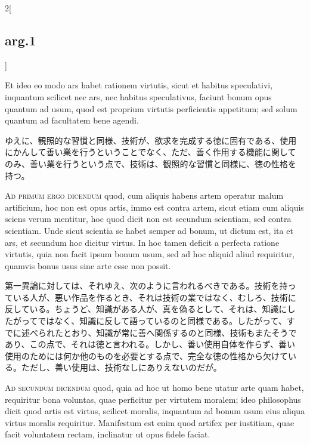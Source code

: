 \documentclass[paper=a4paper,fontsize=10pt,jafontsize=9pt,titlepage]{jlreq}
\begin{document}
\begin{paracol}{2}[\subsection{arg.1}]
\switchcolumn*

Et ideo eo modo ars habet rationem virtutis, sicut et habitus
speculativi, inquantum scilicet nec ars, nec habitus speculativus,
faciunt bonum opus quantum ad usum, quod est proprium virtutis
perficientis appetitum; sed solum quantum ad facultatem bene agendi.

\switchcolumn

ゆえに、観照的な習慣と同様、技術が、欲求を完成する徳に固有である、使用
にかんして善い業を行うということでなく、ただ、善く作用する機能に関して
のみ、善い業を行うという点で、技術は、観照的な習慣と同様に、徳の性格を
持つ。

\switchcolumn*[\subsection{ad.1}]

{\scshape Ad primum ergo dicendum} quod, cum aliquis habens artem
operatur malum artificium, hoc non est opus artis, immo est contra
artem, sicut etiam cum aliquis sciens verum mentitur, hoc quod dicit
non est secundum scientiam, sed contra scientiam. Unde sicut scientia
se habet semper ad bonum, ut dictum est, ita et ars, et secundum hoc
dicitur virtus. In hoc tamen deficit a perfecta ratione virtutis, quia
non facit ipsum bonum usum, sed ad hoc aliquid aliud requiritur,
quamvis bonus usus sine arte esse non possit.

\switchcolumn

第一異論に対しては、それゆえ、次のように言われるべきである。技術を持っ
ている人が、悪い作品を作るとき、それは技術の業ではなく、むしろ、技術に
反している。ちょうど、知識がある人が、真を偽るとして、それは、知識にし
たがってではなく、知識に反して語っているのと同様である。したがって、す
でに述べられたとおり、知識が常に善へ関係するのと同様、技術もまたそうで
あり、この点で、それは徳と言われる。しかし、善い使用自体を作らず、善い
使用のためには何か他のものを必要とする点で、完全な徳の性格から欠けてい
る。ただし、善い使用は、技術なしにありえないのだが。

\switchcolumn*[\subsection{ad.2}]

{\scshape Ad secundum dicendum} quod, quia ad hoc ut homo bene utatur
arte quam habet, requiritur bona voluntas, quae perficitur per
virtutem moralem; ideo philosophus dicit quod artis est virtus,
scilicet moralis, inquantum ad bonum usum eius aliqua virtus moralis
requiritur. Manifestum est enim quod artifex per iustitiam, quae facit
voluntatem rectam, inclinatur ut opus fidele faciat.


\end{paracol}
\end{document}
